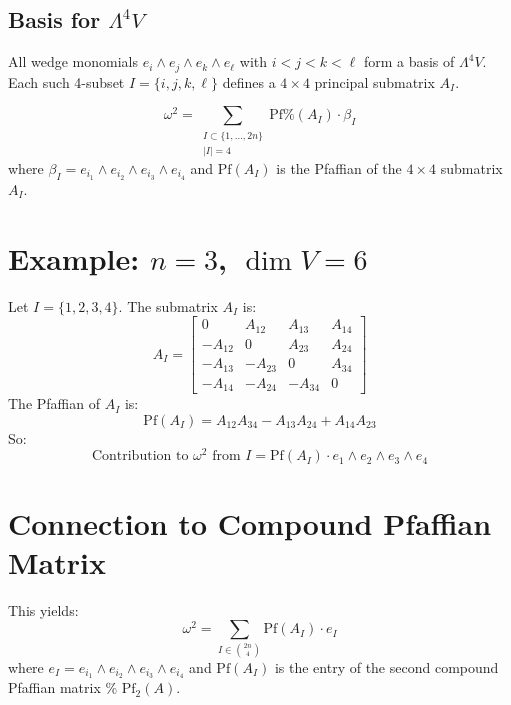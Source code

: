 \documentclass[aps,prd,onecolumn,notitlepage,nofootinbib]{revtex4-2}
\begin{document}
\subsection{Basis for $\Lambda^4 V$}

All wedge monomials $e_i \wedge e_j \wedge e_k \wedge e_\ell$ with $i < j <
k < \ell$ form a basis of $\Lambda^4 V$. Each such 4-subset $I =
\{i,j,k,\ell\}$ defines a $4 \times 4$ principal submatrix $A_I$.

\begin{equation*}
\omega^2 = \sum_{\substack{ I \subset \{1, \dots, 2n\}  \\ |I| = 4}} \text{Pf%
}(A_I) \cdot \beta_I
\end{equation*}
where $\beta_I = e_{i_1} \wedge e_{i_2} \wedge e_{i_3} \wedge e_{i_4}$ and $%
\text{Pf}(A_I)$ is the Pfaffian of the $4 \times 4$ submatrix $A_I$.

\section{Example: $n = 3$, $\dim V = 6$}

Let $I = \{1,2,3,4\}$. The submatrix $A_I$ is: 
\begin{equation*}
A_I = 
\begin{bmatrix}
0 & A_{12} & A_{13} & A_{14} \\ 
-A_{12} & 0 & A_{23} & A_{24} \\ 
-A_{13} & -A_{23} & 0 & A_{34} \\ 
-A_{14} & -A_{24} & -A_{34} & 0%
\end{bmatrix}%
\end{equation*}
The Pfaffian of $A_I$ is: 
\begin{equation*}
\text{Pf}(A_I) = A_{12} A_{34} - A_{13} A_{24} + A_{14} A_{23}
\end{equation*}
So: 
\begin{equation*}
\text{Contribution to } \omega^2 \text{ from } I = \text{Pf}(A_I) \cdot e_1
\wedge e_2 \wedge e_3 \wedge e_4
\end{equation*}

\section{Connection to Compound Pfaffian Matrix}

This yields: 
\begin{equation*}
\omega ^{2}=\sum_{I\in \binom{2n}{4}}\text{Pf}(A_{I})\cdot e_{I}
\end{equation*}%
where $e_{I}=e_{i_{1}}\wedge e_{i_{2}}\wedge e_{i_{3}}\wedge e_{i_{4}}$ and $%
\text{Pf}(A_{I})$ is the entry of the second compound Pfaffian matrix $\text{%
Pf}_{2}(A)$.
\end{document}
